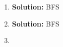 \documentclass[a4paper]{article}
\begin{document}
\section{}
\begin{enumerate}
\item {\bf Solution:} BFS
\item {\bf Solution:} BFS
\item 
\end{enumerate}
\section{}



\section{}
\section{}



\end{document}
